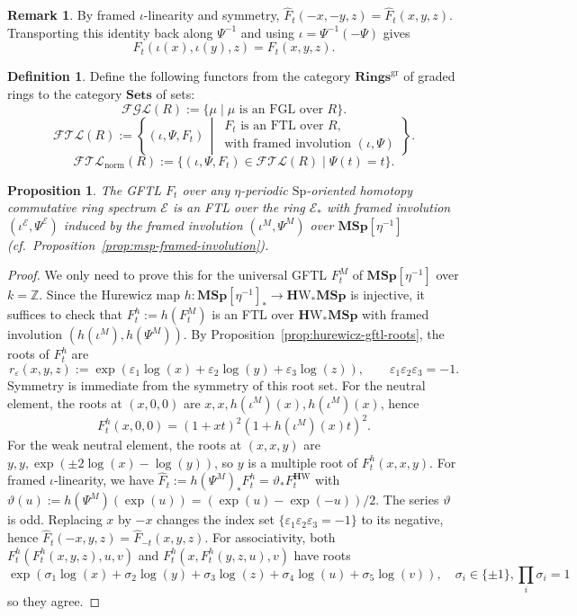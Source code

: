\documentclass[a4paper]{amsart}
\theoremstyle{plain}
\newtheorem{proposition}[subsubsection]{Proposition}
\theoremstyle{definition}
\newtheorem{definition}[subsubsection]{Definition}
\newtheorem{remark}[subsubsection]{Remark}
\newcommand{\Sp}{\mathrm{Sp}}
\newcommand{\MSp}{\mathbf{MSp}}
\newcommand{\etainv}{\eta^{-1}}
\newcommand{\MSpetainv}{{\MSp[\etainv]}}
\newcommand{\E}{\mathcal{E}}
\newcommand{\HW}{\mathbf{H}\mathrm{W}}
\newcommand{\ZZ}{\mathbb{Z}}
\begin{document}
\begin{remark}\label{rem:epsilon-linearity-consequence}
	By framed $\iota$-linearity and symmetry, $\widehat{F}_t(-x,-y,z)=\widehat{F}_t(x,y,z)$. Transporting this identity back along $\Psi^{-1}$ and using $\iota=\Psi^{-1}(-\Psi)$ gives
	\[
		F_t(\iota(x),\iota(y),z)=F_t(x,y,z).
	\]
\end{remark}
\begin{definition}
	Define the following functors from the category $\mathbf{Rings}^{\mathrm{gr}}$ of graded rings to the category $\mathbf{Sets}$ of sets:
	\[
		\mathcal{FGL}(R):=\{\mu \mid \mu \text{ is an FGL over }R\}.
	\]
	\[
		\mathcal{FTL}(R):=
		\left\{
		(\iota, \Psi, F_t)\,\middle|\,
		\begin{array}{l}
			F_t \text{ is an FTL over }R, \\
			\text{with framed involution }(\iota, \Psi)
		\end{array}
		\right\}.
	\]
	\[
		\mathcal{FTL}_{\mathrm{norm}}(R):=\{(\iota, \Psi, F_t) \in \mathcal{FTL}(R) \mid \Psi(t) = t \}.
	\]
\end{definition}

\begin{proposition}
	The GFTL $F_t$ over any $\eta$-periodic $\Sp$-oriented homotopy commutative ring spectrum $\E$ is an FTL over the ring $\E_*$ with framed involution $(\iota^{\E}, \Psi^{\E})$ induced by the framed involution $(\iota^M, \Psi^M)$ over $\MSpetainv$ (cf.~Proposition~\ref{prop:msp-framed-involution}).
\end{proposition}
\begin{proof}
	We only need to prove this for the universal GFTL $F_t^M$ of $\MSpetainv$ over $k=\ZZ$.
	Since the Hurewicz map $h:\MSpetainv_* \to \HW_*\MSp$ is injective, it suffices to check that $F_t^h:=h(F^M_t)$ is an FTL over $\HW_*\MSp$ with framed involution $(h(\iota^{M}), h(\Psi^{M}))$. By Proposition~\ref{prop:hurewicz-gftl-roots}, the roots of $F_t^h$ are
	\[
		r_{\varepsilon}(x,y,z):=\exp \left(\varepsilon_1 \log(x) + \varepsilon_2 \log(y) + \varepsilon_3 \log(z)\right),
		\qquad \varepsilon_1\varepsilon_2\varepsilon_3=-1.
	\]
	Symmetry is immediate from the symmetry of this root set. For the neutral element, the roots at $(x,0,0)$ are $x,x,h(\iota^M)(x),h(\iota^M)(x)$, hence
	\[
		F_t^h(x,0,0)=(1+xt)^2(1+h(\iota^M)(x)t)^2.
	\]
	For the weak neutral element, the roots at $(x,x,y)$ are $y,y,\exp(\pm2\log(x)-\log(y))$, so $y$ is a multiple root of $F_t^h(x,x,y)$. For framed $\iota$-linearity, we have $\widehat{F}_t:= h(\Psi^M)_*F_t^h=\vartheta_*F_t^{\HW}$ with $\vartheta(u):=h(\Psi^M)(\exp(u))=(\exp(u)-\exp(-u))/2$. The series $\vartheta$ is odd. Replacing $x$ by $-x$ changes the index set $\{\varepsilon_1\varepsilon_2\varepsilon_3=-1\}$ to its negative, hence $\widehat{F}_t(-x,y,z)=\widehat{F}_{-t}(x,y,z)$. For associativity, both $F_t^h(F_t^h(x,y,z),u,v)$ and $F_t^h(x,F_t^h(y,z,u),v)$ have roots
	\[
		\exp(\sigma_1\log(x)+\sigma_2\log(y)+\sigma_3\log(z)+\sigma_4\log(u)+\sigma_5\log(v)), \quad \sigma_i\in\{\pm 1\},\prod_{i} \sigma_i =1
	\]
	so they agree.
\end{proof}
\end{document}
